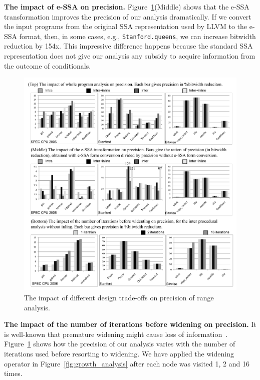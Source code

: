\documentclass{llncs}
\begin{document}
\noindent
\textbf{The impact of e-SSA on precision.}
Figure~\ref{fig:essaDivSSA}(Middle) shows that the e-SSA transformation improves
the precision of our analysis dramatically.
If we convert the input programs from the original SSA representation used
by LLVM to the e-SSA format, then, in some cases, e.g.,
\texttt{Stanford.queens}, we can increase bitwidth reduction by 154x.
This impressive difference happens because the standard SSA representation does
not give our analysis any subsidy to acquire information from the outcome of
conditionals.

\begin{figure}[t!]
\begin{center}
\includegraphics[width=1\textwidth]{images/essaDivSSA}
\end{center}
\caption{\label{fig:essaDivSSA}
The impact of different design trade-offs on precision of range analysis.}
\end{figure}

\noindent
\textbf{The impact of the number of iterations before widening on precision.}
It is well-known that premature widening might cause loss of
information~\cite[Sec5.2]{Cousot09}.
Figure~\ref{fig:essaDivSSA} shows how the precision of our analysis varies with
the number of iterations used before resorting to widening.
We have applied the widening operator in Figure~\ref{fig:growth_analysis}
after each node was visited 1, 2 and 16 times.
\end{document}
